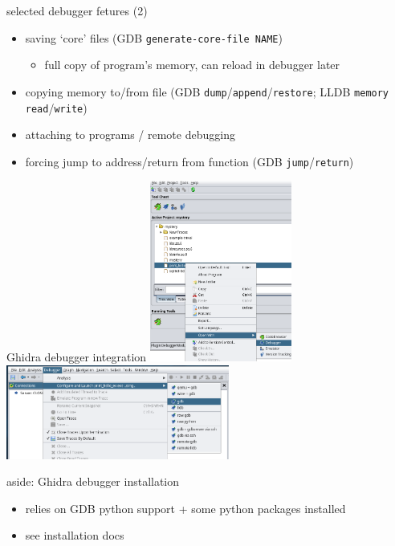 \begin{frame}{selected debugger fetures (2)}
    \begin{itemize}
    \item saving `core' files (GDB \texttt{generate-core-file NAME})
        \begin{itemize}
        \item full copy of program's memory, can reload in debugger later
        \end{itemize}
    \item copying memory to/from file (GDB \texttt{dump}/\texttt{append}/\texttt{restore}; LLDB \texttt{memory read}/\texttt{write})
    \item attaching to programs / remote debugging
    \item forcing jump to address/return from function (GDB \texttt{jump}/\texttt{return})
    \end{itemize}
\end{frame}
\begin{frame}{Ghidra debugger integration}
\includegraphics[width=0.35\textwidth]{../re-tools/ghidra-open-debugger.png}
\includegraphics[width=0.55\textwidth]{../re-tools/ghidra-open-debugger2.png}
\end{frame}

\begin{frame}{aside: Ghidra debugger installation}
    \begin{itemize}
    \item relies on GDB python support + some python packages installed
    \item see installation docs
    \end{itemize}
\end{frame}

